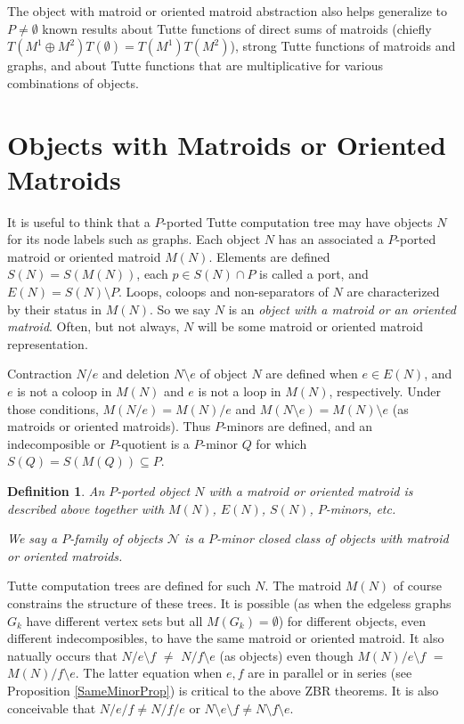\documentclass[12pt,leqno]{amsart}
\newtheorem{definition}[lem]{Definition}
\theoremstyle{remark}
\begin{document}
The object with matroid or oriented matroid abstraction
also helps generalize to $P\neq\emptyset$ known
results about Tutte functions of 
direct sums of matroids (chiefly
$T(M^1\oplus M^2)T(\emptyset)=T(M^1)T(M^2)$),
strong Tutte functions of matroids and 
graphs, and about Tutte functions
that are multiplicative for various combinations
of objects.

\section{Objects with Matroids or Oriented Matroids}

It is useful to think that a $P$-ported Tutte computation tree may have
objects $N$ for its node labels such as graphs.
Each object $N$ has an associated
a $P$-ported matroid or oriented matroid $M(N)$.
Elements are defined $S(N)=S(M(N))$, 
each $p\in S(N)\cap P$ is called a port, and
$E(N)=S(N)\setminus P$.  Loops, coloops and non-separators of $N$
are characterized by their status in $M(N)$.  So we
say $N$ is an \emph{object with a matroid or an oriented matroid}.
Often, but not always, $N$ will be some matroid or oriented
matroid representation.


Contraction $N/e$ and deletion $N\setminus e$ 
of object $N$ are defined when $e\in E(N)$, and
$e$ is not a coloop in $M(N)$ and 
$e$ is not a loop in $M(N)$, respectively.
Under those conditions, $M(N/e)=M(N)/e$ and 
$M(N\setminus e)=M(N)\setminus e$ (as matroids or
oriented matroids).
Thus $P$-minors are defined,
and an indecomposible or $P$-quotient
is a $P$-minor $Q$ for which $S(Q)=S(M(Q))\subseteq P$.

\begin{definition}
\label{OMOMdef}
An $P$-ported object $N$ with a matroid or oriented matroid 
is described above together with $M(N)$, $E(N)$, $S(N)$,
$P$-minors, etc.

We say a $P$-family of objects $\mathcal{N}$ is a $P$-minor closed class of 
objects with matroid or oriented matroids.
\end{definition}

Tutte computation trees are defined for such $N$.
The matroid $M(N)$ of course
constrains the structure of these trees.  
It is possible
(as when the edgeless graphs $G_k$ have different vertex sets but all
$M(G_k)=\emptyset$)
for different objects, 
even different indecomposibles, to have the same 
matroid or oriented matroid.  It also natually occurs 
that
$N/e\setminus f$ $\neq$ 
$N/f\setminus e$ (as objects) even though 
$M(N)/e\setminus f$ $=$ 
$M(N)/f\setminus e$.  The latter equation when 
$e,f$ are in parallel or in series (see Proposition
\ref{SameMinorProp}) is critical to the above ZBR theorems.
It is also conceivable that $N/e/f\neq N/f/e$ or
$N\setminus e\setminus f\neq N\setminus f\setminus e$.
\end{document}
